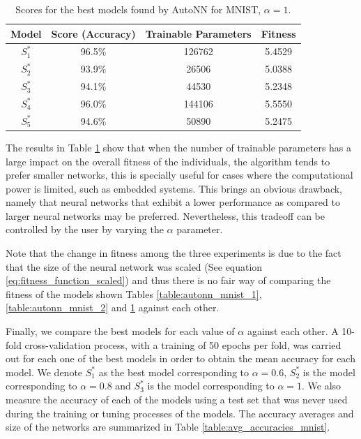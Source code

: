 \documentclass[journal]{IEEEtran}
\begin{document}
\begin{table}[!htb]
\begin{center}
\begin{tabular}{| c | c | c | c |}
\hline
Model & Score (Accuracy) & Trainable Parameters & Fitness\\
\hline
$S^*_1$ & 96.5\% & 126762 & 5.4529\\
$S^*_2$ & 93.9\% & 26506 & 5.0388\\
$S^*_3$ & 94.1\% & 44530 & 5.2348\\
$S^*_4$ & 96.0\% & 144106 & 5.5550\\
$S^*_5$ & 94.6\% & 50890 & 5.2475\\
\hline
\end{tabular}
\end{center}
\caption{Scores for the best models found by AutoNN for MNIST, $\alpha = 1$.}
\label{table:autonn_mnist_3}
\end{table}


The results in Table \ref{table:autonn_mnist_3} show that when the number of trainable parameters has a large impact on the overall fitness of the individuals, the algorithm tends to prefer smaller networks, this is specially useful for cases where the computational power is limited, such as embedded systems. This brings an obvious drawback, namely that neural networks that exhibit a lower performance as compared to larger neural networks may be preferred. Nevertheless, this tradeoff can be controlled by the user by varying the $\alpha$ parameter. 

Note that the change in fitness among the three experiments is due to the fact that the size of the neural network was scaled (See equation \ref{eq:fitness_function_scaled}) and thus there is no fair way of comparing the fitness of the models shown Tables \ref{table:autonn_mnist_1}, \ref{table:autonn_mnist_2} and \ref{table:autonn_mnist_3} against each other.

Finally, we compare the best models for each value of $\alpha$ against each other. A 10-fold cross-validation process, with a training of 50 epochs per fold, was carried out for each one of the best models in order to obtain the mean accuracy for each model. We denote $ S^*_1$ as the best model corresponding to $\alpha = 0.6$, $S^*_2$ is the model corresponding to $\alpha = 0.8$ and $S^*_3$ is the model corresponding to $\alpha = 1$. We also measure the accuracy of each of the models using a test set that was never used during the training or tuning processes of the models. The accuracy averages and size of the networks are summarized in Table \ref{table:avg_accuracies_mnist}.
\end{document}
